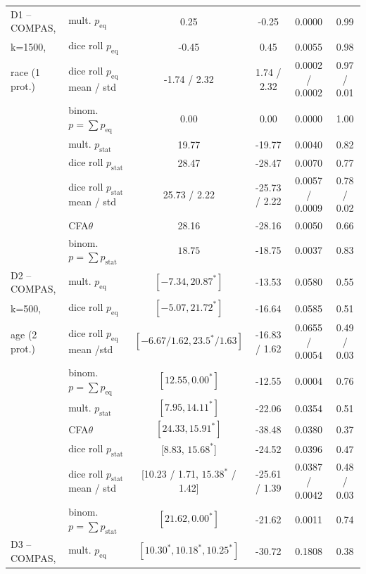\begin{table}[t!]
{\begin{tabular}{llcccc}
		\midrule
		\midrule
		D1 -- COMPAS,	& mult. \algoFAIR $p_{\text{eq}}$ 	& 0.25 	& -0.25 	& 0.0000	& 0.99\\
		k=1500,			& dice roll $p_{\text{eq}}$		& -0.45 & 0.45		& 0.0055 	& 0.98\\
		race (1 prot.)	& dice roll $p_{\text{eq}}$ mean / std	& -1.74 / 2.32 & 1.74 / 2.32		& 0.0002 / 0.0002 	& 0.97 / 0.01\\
		& binom. \algoFAIR $p = \sum p_{\text{eq}}$	& $0.00$		& 0.00		& 0.0000 & 1.00 \\
						\cline{2-6}
						& mult. \algoFAIR $p_{\text{stat}}$	& 19.77 & -19.77 	& 0.0040 	& 0.82\\
						& dice roll $p_{\text{stat}}$	& 28.47 & -28.47	& 0.0070	& 0.77 \\
						& dice roll $p_{\text{stat}}$ mean / std	& 25.73 / 2.22 & -25.73 / 2.22	& 0.0057 / 0.0009	& 0.78 / 0.02 \\
						& CFA$\theta$ 					& 28.16 & -28.16	& 0.0050	& 0.66\\
								& binom. \algoFAIR $p = \sum p_{\text{stat}}$	& $18.75$		& -18.75		& 0.0037 & 0.83 \\
		\midrule
		\midrule
		D2 -- COMPAS, 	& mult. \algoFAIR $p_{\text{eq}}$ 	& $[-7.34, 20.87^*]$ 	& -13.53 	& 0.0580 & 0.55 \\
		k=500,			& dice roll $p_{\text{eq}}$		& $[-5.07, 21.72^*]$ 	& -16.64	& 0.0585 & 0.51\\
		age (2 prot.)	& dice roll $p_{\text{eq}}$	mean /std	& $[-6.67 / 1.62, 23.5^* / 1.63]$ 	& -16.83 / 1.62	& 0.0655 / 0.0054 & 0.49 / 0.03\\
						& binom. \algoFAIR $p = \sum p_{\text{eq}}$	& $[12.55,0.00^*]$		& -12.55		& 0.0004 & 0.76 \\
						\cline{2-6}
						& mult. \algoFAIR $p_{\text{stat}}$ 	& $[7.95, 14.11^*]$ 	& -22.06 	& 0.0354 & 0.51 \\
						& CFA$\theta$ 					& $[24.33, 15.91^*]$ 	& -38.48	& 0.0380 & 0.37 \\ %
						& dice roll $p_{\text{stat}}$ & [8.83, $15.68^*$] 	& -24.52	& 0.0396 & 0.47 \\
						& dice roll $p_{\text{stat}}$	mean / std & [10.23 / 1.71, $15.38^*$ / 1.42] 	& -25.61 / 1.39	& 0.0387 / 0.0042 & 0.48 / 0.03 \\
						& binom. \algoFAIR $p = \sum p_{\text{stat}}$	& $[21.62, 0.00^*]$	& -21.62		& 0.0011 	& 0.74 \\													
		\midrule
		\midrule
		D3 -- COMPAS, 			& mult. \algoFAIR  $p_{\text{eq}}$ 	& $[10.30^*, 10.18^*, 10.25^*]$ & -30.72	& 0.1808 & 0.38 \\

\end{tabular}}
\end{table}

